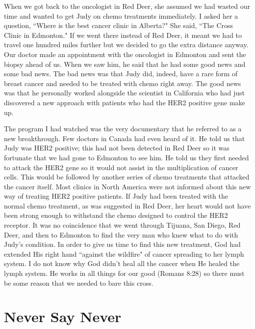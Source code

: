 \documentclass[oneside,12pt]{book}
\begin{document}
When we got back to the oncologist in Red Deer, she assumed we had wasted our time and wanted to get Judy on chemo treatments immediately. I asked her a question, ``Where is the best cancer clinic in Alberta?" She said, ``The Cross Clinic in Edmonton." If we went there instead of Red Deer, it meant we had to travel one hundred miles further but we decided to go the extra distance anyway. Our doctor made an appointment with the oncologist in Edmonton and sent the biopsy ahead of us. When we saw him, he said that he had some good news and some bad news. The bad news was that Judy did, indeed, have a rare form of breast cancer and needed to be treated with chemo right away. The good news was that he personally worked alongside the scientist in California who had just discovered a new approach with patients who had the HER2 positive gene make up.

The program I had watched was the very documentary that he referred to as a new breakthrough. Few doctors in Canada had even heard of it. He told us that Judy was HER2 positive; this had not been detected in Red Deer so it was fortunate that we had gone to Edmonton to see him. He told us they first needed to attack the HER2 gene so it would not assist in the multiplication of cancer cells. This would be followed by another series of chemo treatments that attacked the cancer itself. Most clinics in North America were not informed about this new way of treating HER2 positive patients. If Judy had been treated with the normal chemo treatment, as was suggested in Red Deer, her heart would not have been strong enough to withstand the chemo designed to control the HER2 receptor. It was no coincidence that we went through Tijuana, San Diego, Red Deer, and then to Edmonton to find the very man who knew what to do with Judy's condition. In order to give us time to find this new treatment, God had extended His right hand ``against the wildfire" of cancer spreading to her lymph system. I do not know why God didn't heal all the cancer when He healed the lymph system. He works in all things for our good (Romans 8:28) so there must be some reason that we needed to bare this cross.


\section{Never Say Never}
\
\end{document}
